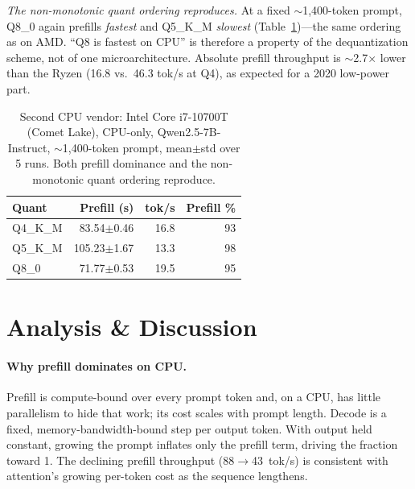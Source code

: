 \documentclass[sigconf,nonacm,10pt]{acmart}
\begin{document}
\emph{The non-monotonic quant ordering reproduces.} At a fixed
$\sim$1{,}400-token prompt, Q8\_0 again prefills \emph{fastest} and
Q5\_K\_M \emph{slowest} (Table~\ref{tab:intel})---the same ordering as on
AMD. ``Q8 is fastest on CPU'' is therefore a property of the dequantization
scheme, not of one microarchitecture. Absolute prefill throughput is
$\sim$2.7$\times$ lower than the Ryzen (16.8 vs.\ 46.3 tok/s at Q4), as
expected for a 2020 low-power part.

\begin{table}[t]
  \centering
  \caption{Second CPU vendor: Intel Core i7-10700T (Comet Lake), CPU-only,
  Qwen2.5-7B-Instruct, $\sim$1{,}400-token prompt, mean$\pm$std over 5 runs.
  Both prefill dominance and the non-monotonic quant ordering reproduce.}
  \label{tab:intel}
  \small
  \begin{tabular}{lrrr}
    \toprule
    Quant & Prefill (s) & tok/s & Prefill \% \\
    \midrule
    Q4\_K\_M & 83.54$\pm$0.46  & 16.8 & 93 \\
    Q5\_K\_M & 105.23$\pm$1.67 & 13.3 & 98 \\
    Q8\_0    & 71.77$\pm$0.53  & 19.5 & 95 \\
    \bottomrule
  \end{tabular}
\end{table}

\section{Analysis \& Discussion}
\label{sec:discussion}

\paragraph{Why prefill dominates on CPU.}
Prefill is compute-bound over every prompt token and, on a CPU, has little
parallelism to hide that work; its cost scales with prompt length. Decode
is a fixed, memory-bandwidth-bound step per output token. With output held
constant, growing the prompt inflates only the prefill term, driving the
fraction toward 1. The declining prefill throughput
(88$\rightarrow$43~tok/s) is consistent with attention's growing per-token
cost as the sequence lengthens.
\end{document}
